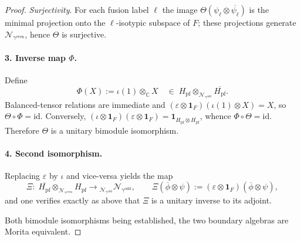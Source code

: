 \documentclass[11pt]{article}
\begin{document}
\begin{proof}
  \emph{Surjectivity}.
  For each fusion label $\boldsymbol\ell$ the image
  $\Theta(\psi_{\boldsymbol\ell}\otimes\overline{\psi_{\boldsymbol\ell}})$
  is the minimal projection onto the $\boldsymbol\ell$-isotypic subspace of
  $F$; these projections generate
  $\mathcal N_{\gamma^{\mathrm{even}}}$, hence $\Theta$ is surjective.

  \paragraph{3. Inverse map $\Phi$.}
  Define
  \[
    \Phi(X):=\iota(1)\otimes_{\mathbb C} X
    \quad\in\;
    H_{\mathrm{pf}}\!\otimes_{\mathcal N_{\gamma^{\mathrm{odd}}}}
    \overline{H_{\mathrm{pf}}}.
  \]
  Balanced-tensor relations are immediate and
  $(\varepsilon\!\otimes\!\mathbf1_F)(\iota(1)\otimes X)=X$,
  so $\Theta\!\circ\!\Phi=\mathrm{id}$.
  Conversely,
  $(\iota\!\otimes\!\mathbf1_F)(\varepsilon\!\otimes\!\mathbf1_F)
  =\mathbf1_{H_{\mathrm{pf}}\otimes\overline{H_{\mathrm{pf}}}}$,
  whence $\Phi\!\circ\!\Theta=\mathrm{id}$.
  Therefore $\Theta$ is a unitary bimodule isomorphism.

  \paragraph{4. Second isomorphism.}
  Replacing $\varepsilon$ by $\iota$ and vice-versa yields the map
  \[
    \Xi:\;
    \overline{H_{\mathrm{pf}}}\!\otimes_{\mathcal N_{\gamma^{\mathrm{even}}}}
    H_{\mathrm{pf}}
    \longrightarrow
    {}_{\mathcal N_{\gamma^{\mathrm{odd}}}}\mathcal N_{\gamma^{\mathrm{odd}}},
    \qquad
    \Xi(\overline\phi\otimes\psi)
    :=(\varepsilon\!\otimes\!\mathbf1_F)(\overline\phi\otimes\psi),
  \]
  and one verifies exactly as above that $\Xi$ is a unitary inverse to its
  adjoint.

  \medskip
  Both bimodule isomorphisms being established, the two boundary algebras
  are Morita equivalent.
\end{proof}
\end{document}
